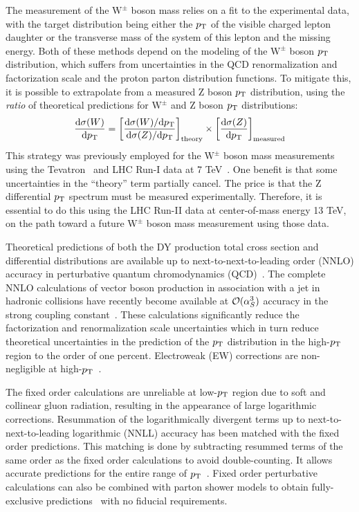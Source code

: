The measurement of the $\mathrm{W^\pm}$ boson mass relies on a fit to the experimental data, with the
target distribution being either the $p_{\mathrm{T}}$ of the visible charged lepton daughter
or the transverse mass of the system of this lepton and the missing energy.
Both of these methods depend on the modeling of the $\mathrm{W^\pm}$ boson $p_{\mathrm{T}}$ distribution,
which suffers from uncertainties in the QCD renormalization and factorization scale and the proton parton distribution functions.
To mitigate this, it is possible to extrapolate from a measured Z boson $p_{\mathrm{T}}$ distribution, using
the \textit{ratio} of theoretical predictions for $\mathrm{W^\pm}$ and Z boson $p_{\mathrm{T}}$ distributions:
\begin{equation}
\frac{\mathrm{d}\sigma(W)}{\mathrm{d} p_{\mathrm{T}}} = \left[ \frac{\mathrm{d}\sigma(W)/\mathrm{d}p_{\mathrm{T}} }{\mathrm{d}\sigma(Z)/\mathrm{d} p_{\mathrm{T}} } \right]_\mathrm{theory} \times \left[ \frac{\mathrm{d}\sigma(Z)}{\mathrm{d} p_{\mathrm{T}}} \right]_\mathrm{measured}
\end{equation}
This strategy was previously employed for the $\mathrm{W^\pm}$ boson mass measurements using the Tevatron~\cite{Abazov:2012bv,Aaltonen:2012bp} and LHC Run-I data at 7 TeV~\cite{Aaboud:2017svj}.
One benefit is that some uncertainties in the ``theory'' term partially cancel.
The price is that the Z differential $p_{\mathrm{T}}$ spectrum must be measured experimentally.
Therefore, it is essential to do this using the LHC Run-II data at center-of-mass energy 13 TeV,
on the path toward a future $\mathrm{W^\pm}$ boson mass measurement using those data.
      
Theoretical predictions of both the DY production total cross section and 
differential distributions are available up to next-to-next-to-leading order 
(NNLO) accuracy in perturbative quantum chromodynamics 
(QCD)~\cite{Melnikov:2006kv,Catani:2009sm}. The complete NNLO calculations of 
vector boson production in association with a jet in hadronic collisions have 
recently become available at $\mathcal{O}(\alpha_S^3)$ accuracy in the strong 
coupling constant~\cite{Ridder:2015dxa,Boughezal:2015ded,Boughezal:2015dva}. 
These calculations significantly reduce the factorization and renormalization scale 
uncertainties which in turn reduce theoretical uncertainties in the prediction 
of the $p_{\mathrm{T}}$ distribution in the high-$p_{\mathrm{T}}$ region to the order of one 
percent. Electroweak (EW) corrections are non-negligible at 
high-$p_{\mathrm{T}}$~\cite{Dittmaier:2014qza,Lindert:2017olm}.      

The fixed order calculations are unreliable at low-$p_{\mathrm{T}}$ region due to soft 
and collinear gluon radiation, resulting in the appearance of large logarithmic 
corrections.
Resummation of the logarithmically divergent terms up to next-to-next-to-leading logarithmic (NNLL) accuracy has been matched with the fixed order predictions.
This matching is done by subtracting resummed terms of the same order as the fixed order calculations to avoid double-counting.
It allows accurate predictions for the entire range of $p_{\mathrm{T}}$~\cite{Balazs:1995nz,Catani:2015vma}.
Fixed order perturbative calculations can also be combined with parton shower models to obtain 
fully-exclusive predictions~\cite{MCatNLO,Nason:2004rx,Frixione:2002ik,Alioli:2010xd} with
no fiducial requirements.      

